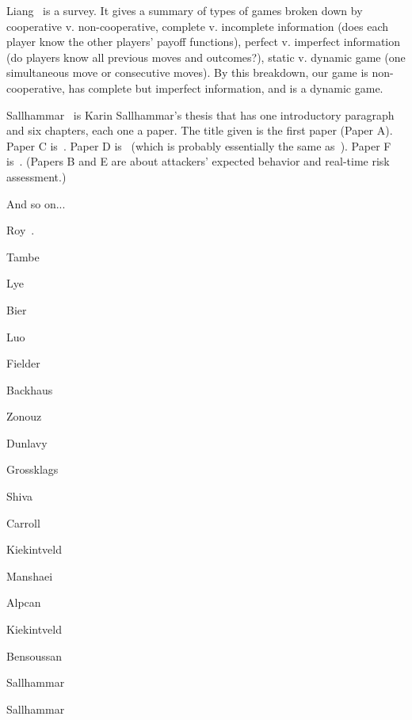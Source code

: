 Liang~\cite{liang2013game} is a survey.  It gives a summary of types of games broken down by cooperative v. non-cooperative, complete v. incomplete information (does each player know the other players' payoff functions), perfect v. imperfect information (do players know all previous moves and outcomes?), static v. dynamic game (one simultaneous move or consecutive moves). By this breakdown, our game is non-cooperative, has complete but imperfect information, and is a dynamic game.

Sallhammar~\cite{sallhammar2007using} is Karin Sallhammar's thesis that has one introductory paragraph and six chapters, each one a paper. The title given is the first paper (Paper A).  Paper C is~\cite{sallhammar2005incorporating}. Paper D is~\cite{sallhammar2006stochastic} (which is probably essentially the same as~\cite{sallhammar2006towards}). Paper F is~\cite{sallhammar2007framework}. (Papers B and E are about attackers' expected behavior and real-time risk assessment.)




And so on...


Roy~\cite{roy2010survey}.

Tambe~\cite{tambe2011security}

Lye~\cite{lye2005game}




Bier~\cite{bier2006game}

Luo~\cite{luo2010game}

Fielder~\cite{fielder2014game}

Backhaus~\cite{backhaus2013cyber}

Zonouz~\cite{zonouz2014rre}

Dunlavy~\cite{dunlavy2009mathematical}

Grossklags~\cite{grossklags2009uncertainty}

Shiva~\cite{shiva2010stochastic}

Carroll~\cite{carroll2011game}

Kiekintveld~\cite{kiekintveld2009computing}

Manshaei~\cite{manshaei2013game}

Alpcan~\cite{alpcan2006intrusion}

Kiekintveld~\cite{kiekintveld2011approximation}

Bensoussan~\cite{bensoussan2010game}

Sallhammar~\cite{sallhammar2007framework}

Sallhammar~\cite{sallhammar2005incorporating}

